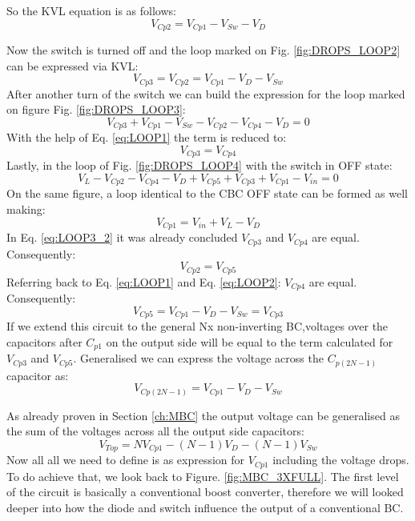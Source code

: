 So the KVL equation is as follows: 
\begin{equation}
	V_{Cp2} = V_{Cp1}-V_{Sw}-V_D
	\label{eq:LOOP1}
\end{equation}

Now the switch is turned off and the loop marked on Fig. \ref{fig:DROPS_LOOP2} can be expressed via KVL: 
\begin{equation}
	V_{Cp3} = V_{Cp2}=V_{Cp1}-V_D-V_{Sw}
	\label{eq:LOOP2}
\end{equation}
After another turn of the switch we can build the expression for the loop marked on figure Fig. \ref{fig:DROPS_LOOP3}:
\begin{equation}
	V_{Cp3}+V_{Cp1}-V_{Sw}-V_{Cp2}-V_{Cp4}-V_D=0
	\label{eq:LOOP3_1}
\end{equation}
With the help of Eq. \ref{eq:LOOP1} the term is reduced to:
\begin{equation}
	V_{Cp3} = V_{Cp4}
	\label{eq:LOOP3_2}
\end{equation}
Lastly, in the loop of Fig. \ref{fig:DROPS_LOOP4} with the switch in OFF state:
\begin{equation}
	V_L-V_{Cp2}-V_{Cp4}-V_D+V_{Cp5}+V_{Cp3}+V_{Cp1}-V_{in}= 0
	\label{eq:LOOP4_1}
\end{equation}
On the same figure, a loop identical to the CBC OFF state can be formed as well making:
\begin{equation}
	V_{Cp1}=V_{in}+V_L-V_D
	\label{eq:LOOP4_2}
\end{equation}
In Eq. \ref{eq:LOOP3_2} it was already concluded $V_{Cp3}$ and $V_{Cp4}$ are equal. Consequently: 
\begin{equation}
	V_{Cp2} = V_{Cp5}
	\label{eq:LOOP4_3}
\end{equation}
Referring back to Eq. \ref{eq:LOOP1} and Eq. \ref{eq:LOOP2}: 
$V_{Cp4}$ are equal. Consequently: 
\begin{equation}
	V_{Cp5}=V_{Cp1}-V_D-V_{Sw} =V_{Cp3} 
	\label{eq:LOOP4_4}
\end{equation}
If we extend this circuit to the general Nx non-inverting BC,voltages over the capacitors after $C_{p1}$ on the output side will be equal to the term calculated for $V_{Cp3}$ and  $V_{Cp5}$. Generalised we can express the voltage across the $C_{p(2N-1)}$ capacitor as: 
\begin{equation}
	V_{Cp(2N-1)}= V_{Cp1}-V_D-V_{Sw} 
	\label{eq:C_2N-1}
\end{equation}

As already proven in Section \ref{ch:MBC} the output voltage can be generalised as the sum of the voltages across all the output side capacitors: 
\begin{equation}
	V_{Top}= NV_{Cp1}-(N-1)V_D-(N-1)V_{Sw} 
	\label{eq:DROPS_V_TOP}
\end{equation}
Now all all we need to define is as expression for $V_{Cp1}$ including the voltage drops. To do achieve that, we look back to Figure. \ref{fig:MBC_3XFULL}. The first level of the circuit is basically a conventional boost converter, therefore we will looked deeper into how the diode and switch influence the output of a conventional BC. 

